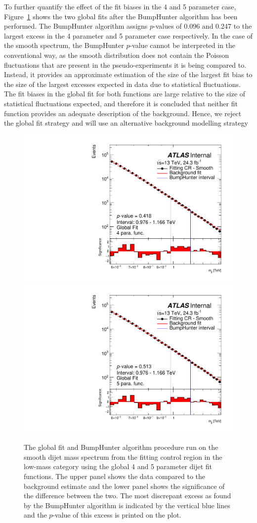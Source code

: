 To further quantify the effect of the fit biases in the 4 and 5 parameter case,
Figure~\ref{fig:bhFit_lm_global} shows the two global fits after the {\sc BumpHunter} algorithm has been performed.
The {\sc BumpHunter} algorithm assigns \mbox{$p$-values} of 0.096 and 0.247 to the largest excess in the 4 parameter and 5 parameter case respectively.
In the case of the smooth spectrum, the {\sc BumpHunter} \mbox{$p$-value} cannot be interpreted in the conventional way,
as the smooth distribution does not contain the Poisson fluctuations that are present in the pseudo-experiments it is being compared to.
Instead, it provides an approximate estimation of the size of the largest fit bias to the size of the largest excesses expected in data due to statistical fluctuations.
The fit biases in the global fit for both functions are large relative to the size of statistical fluctuations expected,
and therefore it is concluded that neither fit function provides an adequate description of the background.
Hence, we reject the global fit strategy and will use an alternative background modelling strategy

\begin{figure}[!htb]
\captionsetup[subfigure]{aboveskip=0pt,justification=centering}
\centering
{} {
  \includegraphics[width=0.45\linewidth, angle=0]{figs/Dibjet/LowMass/FitStudy_min566/globalFit_lm_bH_4para.pdf}
}
 {
  \includegraphics[width=0.45\linewidth, angle=0]{figs/Dibjet/LowMass/FitStudy_min566/globalFit_lm_bH_5para.pdf}
}

\caption{\label{fig:bhFit_lm_global}
  The global fit and {\sc BumpHunter} algorithm procedure run on the smooth dijet mass spectrum from the fitting control region in the low-mass category
  using the global 4 and 5 parameter dijet fit functions.
  The upper panel shows the data compared to the background estimate and the lower panel shows the significance of the difference between the two.
  The most discrepant excess as found by the {\sc BumpHunter} algorithm is indicated by the vertical blue lines and the \mbox{$p$-value} of this excess is printed on the plot. }
\end{figure}

